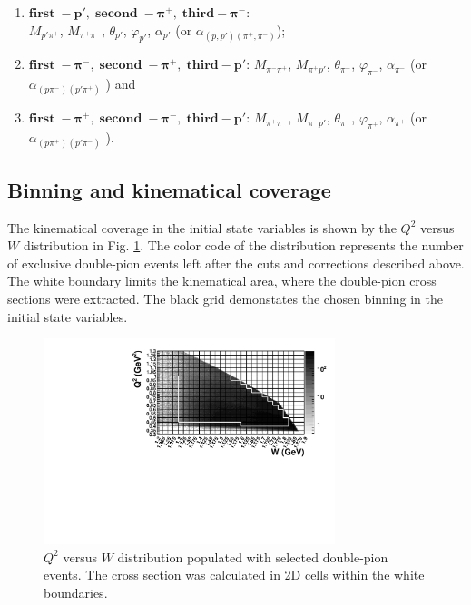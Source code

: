 \documentclass[prc,twocolumn,superscriptaddress,showpacs,amssymb,amsmath,amsfonts,linenumbers,aps]{revtex4-1}
\begin{document}
\begin{enumerate}
\item $\boldsymbol{first\; - p',\; second \; - \pi^{+},\; third - \pi^{-}}$: \\ $M_{p'\pi^{+}}$, $M_{\pi^{+}\pi^{-}}$, $\theta_{p'}$, $\varphi_{p'}$,  $\alpha_{p'}$ (or $\alpha_{(p,p')(\pi^{+},\pi^{-})}$);
\item $\boldsymbol{first\; - \pi^{-},\; second \; - \pi^{+},\; third - p'}$: $M_{\pi^{-}\pi^{+}}$, $M_{\pi^{+}p'}$, $\theta_{\pi^{-}}$, $\varphi_{\pi^{-}}$, $\alpha_{\pi^{-}}$ (or $\alpha_{(p\pi^{-})(p'\pi^{+})}$ ) and
\item $\boldsymbol{first\; - \pi^{+},\; second \; - \pi^{-},\; third - p'}$: $M_{\pi^{+}\pi^{-}}$, $M_{\pi^{-}p'}$, $\theta_{\pi^{+}}$, $\varphi_{\pi^{+}}$, $\alpha_{\pi^{+}}$ (or $\alpha_{(p\pi^{+})(p'\pi^{-})}$ ).
\end{enumerate}







\subsection{Binning and kinematical coverage}

The kinematical coverage in the initial state variables is shown by the $Q^{2}$ versus $W$ distribution in Fig. \ref{fig:q2vsw}. The color code of the distribution represents the number of exclusive double-pion events left after the cuts and corrections described above. 
The white boundary limits the kinematical area, where the double-pion cross sections were extracted. The black grid demonstates the chosen binning in the initial state variables. 



\begin{figure}[htp]
\begin{center}
 \includegraphics[width=8.5cm,keepaspectratio]{pictures/binning/q2vsw.pdf} 
\vspace{-0.1cm}
\caption{$Q^2$ versus $W$ distribution populated with selected double-pion events. The cross section was calculated in 2D cells within the white boundaries.}
\label{fig:q2vsw}
\end{center}
\end{figure} 
\end{document}
